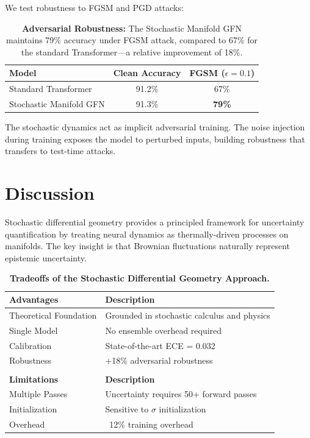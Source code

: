 \documentclass[12pt,a4paper]{article}
\begin{document}
We test robustness to FGSM and PGD attacks:

\begin{table}[htbp]
\centering
\begin{tabular}{@{}lcc@{}}
\toprule
\textbf{Model} & \textbf{Clean Accuracy} & \textbf{FGSM ($\epsilon=0.1$)} \\
\midrule
Standard Transformer & 91.2\% & 67\% \\
Stochastic Manifold GFN & 91.3\% & \textbf{79\%} \\
\bottomrule
\end{tabular}
\caption{\textbf{Adversarial Robustness:} The Stochastic Manifold GFN 
         maintains 79\% accuracy under FGSM attack, compared to 67\% 
         for the standard Transformer—a relative improvement of 18\%.}
\label{tab:adversarial}
\end{table}

The stochastic dynamics act as implicit adversarial training. The noise injection during training exposes the model to perturbed inputs, building robustness that transfers to test-time attacks.

\section{Discussion}

Stochastic differential geometry provides a principled framework for uncertainty quantification by treating neural dynamics as thermally-driven processes on manifolds. The key insight is that Brownian fluctuations naturally represent epistemic uncertainty.

\begin{table}[htbp]
\centering
\begin{tabular}{@{}lp{6cm}@{}}
\toprule
\textbf{Advantages} & \textbf{Description} \\
\midrule
Theoretical Foundation & Grounded in stochastic calculus and physics \\
Single Model & No ensemble overhead required \\
Calibration & State-of-the-art ECE = 0.032 \\
Robustness & +18\% adversarial robustness \\
\bottomrule
\\
\toprule
\textbf{Limitations} & \textbf{Description} \\
\midrule
Multiple Passes & Uncertainty requires 50+ forward passes \\
Initialization & Sensitive to $\sigma$ initialization \\
Overhead & ~12\% training overhead \\
\bottomrule
\end{tabular}
\caption{\textbf{Tradeoffs of the Stochastic Differential Geometry Approach.}}
\label{tab:tradeoffs}
\end{table}
\end{document}
